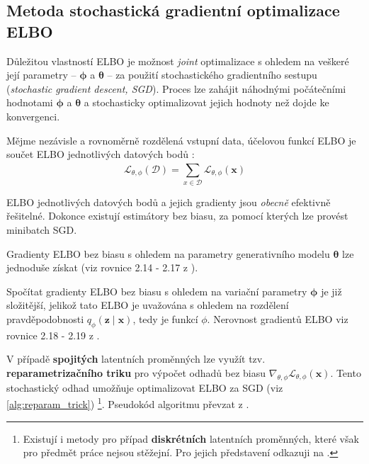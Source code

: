 \subsection{Metoda stochastická gradientní optimalizace ELBO}
Důležitou vlastností ELBO je možnost \emph{joint} optimalizace s ohledem na veškeré její parametry – $\boldsymbol{\phi}$ a $\boldsymbol{\theta}$ – za použití stochastického gradientního sestupu (\emph{stochastic gradient descent, SGD}).
Proces lze zahájit náhodnými počátečními hodnotami $\boldsymbol{\phi}$ a $\boldsymbol{\theta}$ a stochasticky optimalizovat jejich hodnoty než dojde ke konvergenci. \cite{Kingma2019}

Mějme nezávisle a rovnoměrně rozdělená vstupní data, účelovou funkcí ELBO je součet ELBO jednotlivých datových bodů \cite{Kingma2019}:
\begin{equation}
    \mathcal{L}_{\theta,\phi}(\mathcal{D}) = \sum_{x\in\mathcal{D}}^{} \mathcal{L}_{\theta,\phi}(\textbf{x})
\end{equation}

ELBO jednotlivých datových bodů a jejich gradienty jsou \emph{obecně} efektivně řešitelné.
Dokonce existují estimátory bez biasu, za pomocí kterých lze provést minibatch SGD.

Gradienty ELBO bez biasu s ohledem na parametry generativního modelu $\boldsymbol{\theta}$ lze jednoduše získat (viz rovnice 2.14 - 2.17 z \cite{Kingma2019}).

Spočítat gradienty ELBO bez biasu s ohledem na variační parametry $\boldsymbol{\phi}$ je již složitější, jelikož tato ELBO je uvažována s ohledem na rozdělení pravděpodobnosti $q_\phi(\textbf{z}\mid\textbf{x})$, tedy je funkcí $\phi$. Nerovnost gradientů ELBO viz rovnice 2.18 - 2.19 z \cite{Kingma2019}.

V případě \textbf{spojitých} latentních proměnných lze využít tzv. \textbf{reparametrizačního triku} pro výpočet odhadů bez biasu $\nabla_{\theta,\phi}\mathcal{L}_{\theta,\phi}(\textbf{x})$.
Tento stochastický odhad umožňuje optimalizovat ELBO za SGD (viz \autoref{alg:reparam_trick})
\footnote{Existují i metody pro případ \textbf{diskrétních} latentních proměnných, které však pro předmět práce nejsou stěžejní. Pro jejich představení odkazuji na \cite[Sekce 2.9.1.]{Kingma2019}.}. Pseudokód algoritmu převzat z \cite{Kingma2019}.

